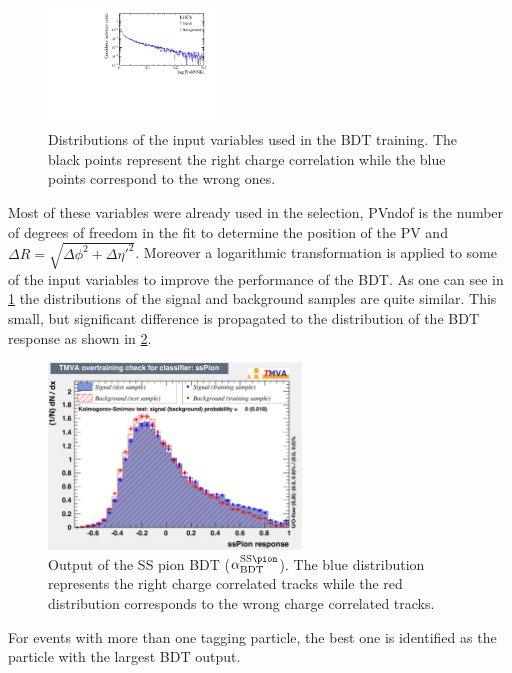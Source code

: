 \begin{figure}[tbp]
\begin{center}
		\includegraphics[width=0.40\textwidth]{08FlavourTagging/figs/BDT_PIDNNk_flat.pdf}
	\end{center}
	\caption{Distributions of the input variables used in the BDT training.
	The black points represent the right charge correlation while the blue points correspond to the wrong ones.}
	\label{fig:BDTInputSSPion}
\end{figure}
Most of these variables were already used in the selection, PVndof is the number of degrees of freedom in the fit to determine the position of the \ac{PV} and $\Delta R=\sqrt{\Delta\phi^2+\Delta\eta'^2}$.
Moreover a logarithmic transformation is applied to some of the input variables to improve the performance of the BDT.
As one can see in \cref{fig:BDTInputSSPion} the distributions of the signal and background samples are quite similar.
This small, but significant difference is propagated to the distribution of the BDT response as shown in \cref{fig:BDTovertrainSSPion}.
\begin{figure}[tbp]
	\begin{center}
		\includegraphics[width=0.6\textwidth]{08FlavourTagging/figs/SSPionBDT_overtrain.pdf}
	\end{center}
	\caption{Output of the SS pion BDT ($\alpha^{\text{SS}\pion}_\text{BDT}$).
	The blue distribution represents the right charge correlated tracks while the red distribution corresponds to the wrong charge correlated tracks.}
	\label{fig:BDTovertrainSSPion}
\end{figure}
For events with more than one tagging particle, the best one is identified as the particle with the largest BDT output.

